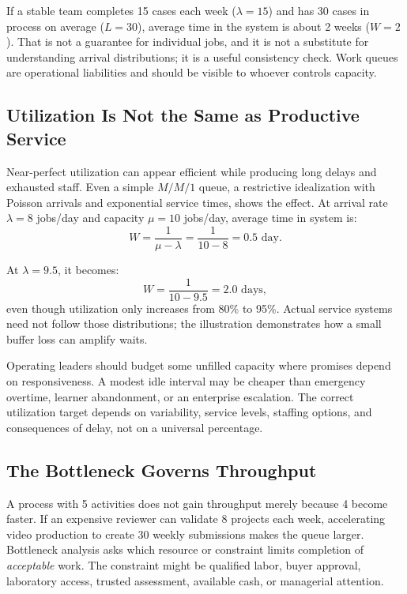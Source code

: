 If a stable team completes 15 cases each week ($\lambda = 15$) and has 30 cases in process on average ($L = 30$), average time in the system is about 2 weeks ($W = 2$). That is not a guarantee for individual jobs, and it is not a substitute for understanding arrival distributions; it is a useful consistency check. Work queues are operational liabilities and should be visible to whoever controls capacity.

\subsection{Utilization Is Not the Same as Productive Service}
\label{sec:utilization_vs_service}

Near-perfect utilization can appear efficient while producing long delays and exhausted staff. Even a simple $M/M/1$ queue, a restrictive idealization with Poisson arrivals and exponential service times, shows the effect. At arrival rate $\lambda = 8$ jobs/day and capacity $\mu = 10$ jobs/day, average time in system is:
\begin{equation}
W = \frac{1}{\mu - \lambda} = \frac{1}{10 - 8} = 0.5\text{ day}.
\end{equation}

At $\lambda = 9.5$, it becomes:
\begin{equation}
W = \frac{1}{10 - 9.5} = 2.0\text{ days},
\end{equation}
even though utilization only increases from 80\% to 95\%. Actual service systems need not follow those distributions; the illustration demonstrates how a small buffer loss can amplify waits.

Operating leaders should budget some unfilled capacity where promises depend on responsiveness. A modest idle interval may be cheaper than emergency overtime, learner abandonment, or an enterprise escalation. The correct utilization target depends on variability, service levels, staffing options, and consequences of delay, not on a universal percentage.

\subsection{The Bottleneck Governs Throughput}
\label{sec:bottleneck_governs_throughput}

A process with 5 activities does not gain throughput merely because 4 become faster. If an expensive reviewer can validate 8 projects each week, accelerating video production to create 30 weekly submissions makes the queue larger. Bottleneck analysis asks which resource or constraint limits completion of \textit{acceptable} work. The constraint might be qualified labor, buyer approval, laboratory access, trusted assessment, available cash, or managerial attention.

